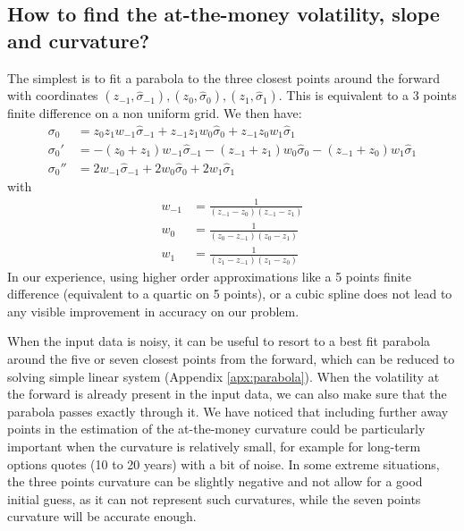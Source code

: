 \documentclass[]{rAMF2e}
\begin{document}
  
%
\subsection{How to find the at-the-money volatility, slope and curvature?}
The simplest is to fit a parabola to the three closest points around the forward with coordinates $(z_{-1}, \hat{\sigma}_{-1}), (z_0,\hat{\sigma}_0), (z_{1},\hat{\sigma}_1)$. This is equivalent to a 3 points finite difference on a non uniform grid. We then have:
\begin{align}
\sigma_0 &= z_0 z_1 w_{-1} \hat{\sigma}_{-1} + z_{-1} z_1 w_{0} \hat{\sigma}_{0} +  z_{-1} z_0w_{1} \hat{\sigma}_{1}\\
\sigma_0' &= -(z_0 + z_1) w_{-1} \hat{\sigma}_{-1} - (z_{-1}+ z_1) w_{0} \hat{\sigma}_{0} -  (z_{-1}+ z_0)w_{1} \hat{\sigma}_{1}\\
\sigma_0'' &= 2 w_{-1} \hat{\sigma}_{-1} +2 w_{0} \hat{\sigma}_{0} + 2w_{1} \hat{\sigma}_{1}
\end{align}
with 
\begin{align}
w_{-1} &= \frac{1}{(z_{-1}-z_{0})(z_{-1}-z_{1})}\\
w_{0} &= \frac{1}{(z_{0}-z_{-1})(z_{0}-z_{1})}\\
w_{1} &= \frac{1}{(z_{1}-z_{-1})(z_{1}-z_{0})}
\end{align}
In our experience, using higher order approximations like a 5 points finite difference (equivalent to a quartic on 5 points), or a cubic spline does not lead to any visible improvement in accuracy on our problem.
 
When the input data is noisy, it can be useful to resort to a best fit parabola around the five or seven closest points from the forward, which can be reduced to solving simple linear system (Appendix \ref{apx:parabola}). When the volatility at the forward is already present in the input data, we can also make sure that the parabola passes exactly through it. We have noticed that including further away points in the estimation of the at-the-money curvature could be particularly important when the curvature is relatively small, for example for long-term options quotes (10 to 20 years) with a bit of noise. In some extreme situations, the three points curvature can be slightly negative and not allow for a good initial guess, as it can not represent such curvatures, while the seven points curvature will be accurate enough.
\end{document}
